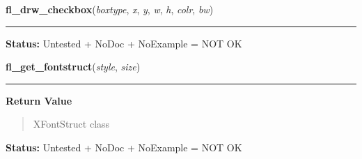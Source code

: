     \label{xformslib:library:fl_drw_checkbox}

    \vspace{0.5ex}

\hspace{.8\funcindent}\begin{boxedminipage}{\funcwidth}

    \raggedright \textbf{fl\_drw\_checkbox}(\textit{boxtype}, \textit{x}, \textit{y}, \textit{w}, \textit{h}, \textit{colr}, \textit{bw})

    \vspace{-1.5ex}

    \rule{\textwidth}{0.5\fboxrule}
\setlength{\parskip}{2ex}
\setlength{\parskip}{1ex}
\textbf{Status:} Untested + NoDoc + NoExample = NOT OK



    \end{boxedminipage}

    \label{xformslib:library:fl_get_fontstruct}

    \vspace{0.5ex}

\hspace{.8\funcindent}\begin{boxedminipage}{\funcwidth}

    \raggedright \textbf{fl\_get\_fontstruct}(\textit{style}, \textit{size})

    \vspace{-1.5ex}

    \rule{\textwidth}{0.5\fboxrule}
\setlength{\parskip}{2ex}
\setlength{\parskip}{1ex}
      \textbf{Return Value}
    \vspace{-1ex}

      \begin{quote}
      XFontStruct class

      \end{quote}

\textbf{Status:} Untested + NoDoc + NoExample = NOT OK



    \end{boxedminipage}

    \label{xformslib:library:fl_get_fontstruct}

